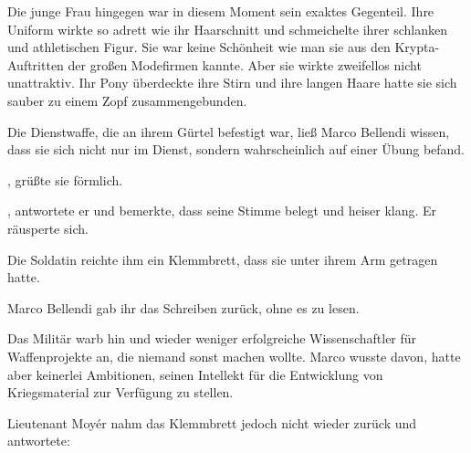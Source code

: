 \par

Die junge Frau hingegen war in diesem Moment sein exaktes Gegenteil. Ihre Uniform wirkte so adrett wie ihr Haarschnitt und schmeichelte ihrer schlanken und athletischen Figur. Sie war keine Schönheit wie man sie aus den Krypta-Auftritten der großen Modefirmen kannte. Aber sie wirkte zweifellos nicht unattraktiv. Ihr Pony überdeckte ihre Stirn und ihre langen Haare hatte sie sich sauber zu einem Zopf zusammengebunden.

\par

Die Dienstwaffe, die an ihrem Gürtel befestigt war, ließ Marco Bellendi wissen, dass sie sich nicht nur im Dienst, sondern wahrscheinlich auf einer Übung befand.

\par

, grüßte sie förmlich. 

\par

, antwortete er und bemerkte, dass seine Stimme belegt und heiser klang. Er räusperte sich. 

\par

Die Soldatin reichte ihm ein Klemmbrett, dass sie unter ihrem Arm getragen hatte. 

\par

Marco Bellendi gab ihr das Schreiben zurück, ohne es zu lesen. 

\par

Das Militär warb hin und wieder weniger erfolgreiche Wissenschaftler für Waffenprojekte an, die niemand sonst machen wollte. Marco wusste davon, hatte aber keinerlei Ambitionen, seinen Intellekt für die Entwicklung von Kriegsmaterial zur Verfügung zu stellen.

\par

Lieutenant Moyér nahm das Klemmbrett jedoch nicht wieder zurück und antwortete: 

